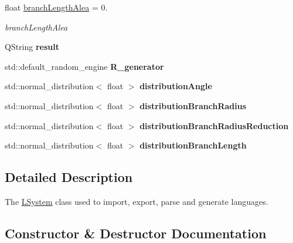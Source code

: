\begin{DoxyCompactItemize}
\mbox{\label{classLSystem_a705548d3cd93d913f971ddab7583dcb5}} 
float \hyperlink{classLSystem_a705548d3cd93d913f971ddab7583dcb5}{branch\+Length\+Alea} = 0.
\begin{DoxyCompactList}\small\item\em branch\+Length\+Alea \end{DoxyCompactList}\item 
\mbox{\label{classLSystem_a8cd1754c2ca9e6f36b97e635a89c38bb}} 
Q\+String {\bfseries result}
\item 
\mbox{\label{classLSystem_a6085454616ac1e3d2694e953069d159a}} 
std\+::default\+\_\+random\+\_\+engine {\bfseries R\+\_\+generator}
\item 
\mbox{\label{classLSystem_a473138ada139e110f0e478dea06030e2}} 
std\+::normal\+\_\+distribution$<$ float $>$ {\bfseries distribution\+Angle}
\item 
\mbox{\label{classLSystem_aad552a812175cc283059e4e2df2a558a}} 
std\+::normal\+\_\+distribution$<$ float $>$ {\bfseries distribution\+Branch\+Radius}
\item 
\mbox{\label{classLSystem_a6aa50ae236060b40ba202e06635a2248}} 
std\+::normal\+\_\+distribution$<$ float $>$ {\bfseries distribution\+Branch\+Radius\+Reduction}
\item 
\mbox{\label{classLSystem_a892904bca26a2aea3a7bf0064b2f7edd}} 
std\+::normal\+\_\+distribution$<$ float $>$ {\bfseries distribution\+Branch\+Length}
\end{DoxyCompactItemize}


\subsection{Detailed Description}
The \hyperlink{classLSystem}{L\+System} class used to import, export, parse and generate languages. 

\subsection{Constructor \& Destructor Documentation}
\mbox{\label{classLSystem_ab867b4862befaaf5032f9d5d7c54d958}} 

